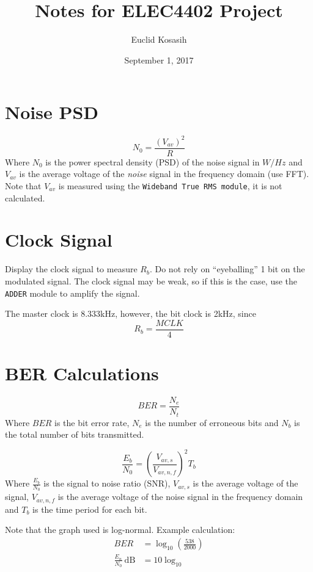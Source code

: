 \documentclass[a4paper]{article}
\author{Euclid Kosasih}
\date{September 1, 2017}
\title{Notes for ELEC4402 Project}
\begin{document}
\maketitle
\section{Noise PSD}
\begin{equation}
	N_0 = \frac{(V_{av})^2}{R}
\end{equation}
Where $N_0$ is the power spectral density (PSD) of the noise signal in $W/Hz$ and $V_{av}$ is the average voltage of the \textit{noise} signal in the frequency domain (use FFT). Note that $V_{av}$ is measured using the \texttt{Wideband True RMS module}, it is not calculated.

\section{Clock Signal}
Display the clock signal to measure $R_b$. Do not rely on ``eyeballing'' 1 bit on the modulated signal. The clock signal may be weak, so if this is the case, use the \texttt{ADDER} module to amplify the signal. 

The master clock is 8.333kHz, however, the bit clock is 2kHz, since
\begin{equation}
	R_b = \frac{MCLK}{4}
\end{equation}

\section{BER Calculations}
\begin{equation}
	BER = \frac{N_e}{N_t}
\end{equation}
Where $BER$ is the bit error rate, $N_e$ is the number of erroneous bits and $N_b$ is the total number of bits transmitted.

\begin{equation}
	\frac{E_b}{N_0} = \left(\frac{V_{av,s}}{V_{av,n,f}}\right)^2T_b
\end{equation}
Where $\frac{E_b}{N_0}$ is the signal to noise ratio (SNR), $V_{av,s}$ is the average voltage of the signal, $V_{av,n,f}$ is the average voltage of the noise signal in the frequency domain and $T_b$ is the time period for each bit.

Note that the graph used is log-normal. Example calculation:
\begin{align}
	BER &= \log_{10}{\left(\frac{538}{2000}\right)}\\
	\frac{E_n}{N_0}\ \mathrm{dB} &= 10\log_{10}
\end{align}
\end{document}
